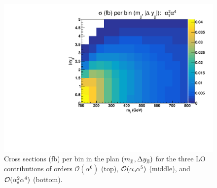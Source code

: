 \begin{figure}[hbt]
\includegraphics[scale=0.395]{figures/scanfigures/scan_ew4qcd2.pdf}
\caption{Cross sections (fb) per bin in the plan $\left(m_{\text{j}\text{j}}, \Delta y_{\text{j}\text{j}}\right)$ for the three LO contributions of orders $\mathcal{O}(\alpha^6)$ (top), $\mathcal{O}(\alpha_\text{s}\alpha^5)$ (middle), and $\mathcal{O}(\alpha_\text{s}^2 \alpha^4)$ (bottom).
}
\label{fig:mjjdyjj_2d_LO}
\end{figure}
